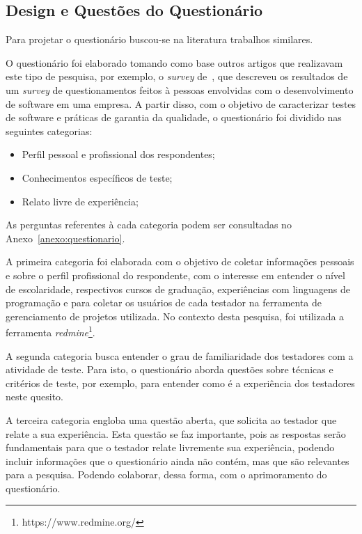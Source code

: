 \subsection{Design e Questões do Questionário}
\label{sec:desingquestions}

Para projetar o questionário buscou-se na literatura trabalhos similares.

O questionário foi elaborado tomando como base outros artigos que realizavam este tipo de pesquisa, por exemplo, o \textit{survey} de~\cite{geras2004survey}, que descreveu os resultados de um \textit{survey} de questionamentos feitos à pessoas envolvidas com o desenvolvimento de software em uma empresa. A partir disso, com o objetivo de caracterizar testes de software e práticas de garantia da qualidade, o questionário foi dividido nas seguintes categorias:

\begin{itemize}
\item  Perfil pessoal e profissional dos respondentes;
\item  Conhecimentos específicos de teste;
\item  Relato livre de experiência;
\end{itemize}

As perguntas referentes à cada categoria podem ser consultadas no Anexo~\ref{anexo:questionario}.

A primeira categoria foi elaborada com o objetivo de coletar informações pessoais e sobre o perfil profissional do respondente, com o interesse em entender o nível de escolaridade, respectivos cursos de graduação, experiências com linguagens de programação e para coletar os usuários de cada testador na ferramenta de gerenciamento de projetos utilizada. No contexto desta pesquisa, foi utilizada a ferramenta \textit{redmine}\footnote{https://www.redmine.org/}.

A segunda categoria busca entender o grau de familiaridade dos testadores com a atividade de teste. Para isto, o questionário aborda questões sobre técnicas e critérios de teste, por exemplo, para entender como é a experiência dos testadores neste quesito.

A terceira categoria engloba uma questão aberta, que solicita ao testador que relate a sua experiência. Esta questão se faz importante, pois as respostas serão fundamentais para que o testador relate livremente sua experiência, podendo incluir informações que o questionário ainda não contém, mas que são relevantes para a pesquisa. Podendo colaborar, dessa forma, com o aprimoramento do questionário.

